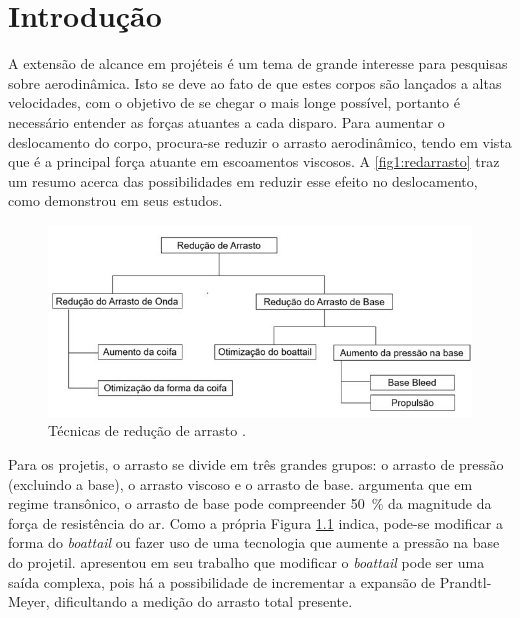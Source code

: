 \chapter{Introdução}
\graphicspath{{chapter-01/img-cap01/}}

A extensão de alcance em projéteis é um tema de grande interesse para pesquisas sobre aerodinâmica. Isto se deve ao fato de que estes corpos são lançados a altas velocidades, com o objetivo de se chegar o mais longe possível, portanto é necessário entender as forças atuantes a cada disparo. Para aumentar o deslocamento do corpo, procura-se reduzir o arrasto aerodinâmico, tendo em vista que é a principal força atuante em escoamentos viscosos. A \autoref{fig1:redarrasto} traz um resumo acerca das possibilidades em reduzir esse efeito no deslocamento, como \citeauthor{Dali2018a} demonstrou em seus estudos.

\begin{figure}[!ht]
	\centering
	\includegraphics[width=1.0\textwidth]{foto01-reducao-arrasto.png}
	\caption[Técnicas de redução de arrasto, traduzido e adaptado.]{Técnicas de redução de arrasto \cite{Dali2018a}.}
	\label{fig1:redarrasto}
\end{figure}

Para os projetis, o arrasto se divide em três grandes grupos: o arrasto de pressão (excluindo a base), o arrasto viscoso e o arrasto de base. \citeauthor{Sahu1985} argumenta que em regime transônico, o arrasto de base pode compreender \qty{50}{\percent} da magnitude da força de resistência do ar. Como a própria Figura \ref{fig1:redarrasto} indica, pode-se modificar a forma do \textit{boattail} ou fazer uso de uma tecnologia que aumente a pressão na base do projetil. \citeauthor{Sedney1966} apresentou em seu trabalho que modificar o \textit{boattail} pode ser uma saída complexa, pois há a possibilidade de incrementar a expansão de Prandtl-Meyer, dificultando a medição do arrasto total presente.

